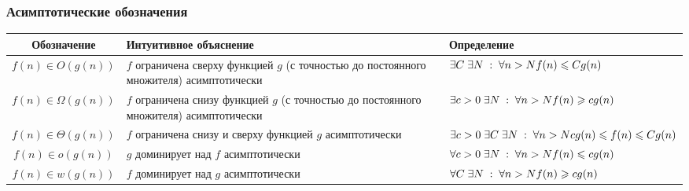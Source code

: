 \subsubsection{Асимптотические обозначения}
\begin{tabular}{ | c | m{15em}| m{15em} | } 
  \hline
  Обозначение & Интуитивное объяснение & Определение \\ 
  \hline
  $f(n) \in O(g(n))$ & $f$ ограничена сверху функцией $g$ (с точностью до постоянного множителя) асимптотически & $\exists C 
 \;\exists N \; : \; \forall n > N \newline f(n) \leqslant C g(n)$ \\ 
  \hline
  $f(n) \in \Omega(g(n))$  & $f$ ограничена снизу функцией $g$ (с точностью до постоянного множителя) асимптотически & $\exists c>0 \;\exists N \; : \; \forall n > N \newline f(n) \geqslant cg(n)$ \\ 
  \hline
  $f(n) \in \Theta(g(n))$ & $f$ ограничена снизу и сверху функцией $g$ асимптотически & $\exists c>0 \; \exists C \;\exists N \; : \; \forall n > N \newline c g(n) \leqslant f(n) \leqslant Cg(n)$ \\ 
  \hline
  $f(n) \in o(g(n))$ & $g$ доминирует над $f$ асимптотически & $\forall c>0 
 \;\exists N \; : \; \forall n > N \newline f(n) \leqslant c g(n)$ \\ 
  \hline
  $f(n) \in w(g(n))$ & $f$ доминирует над $g$ асимптотически & $\forall C \;\exists N \; : \; \forall n > N \newline f(n) \geqslant cg(n)$ \\ 
  \hline
\end{tabular}

